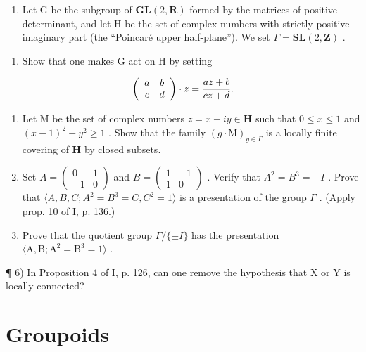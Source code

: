 \begin{enumerate}
\def\labelenumi{\arabic{enumi})}
\setcounter{enumi}{4}
\tightlist
\item
  Let G be the subgroup of \(\mathbf{GL}(2,\mathbf{R})\) formed by the matrices of positive determinant, and let H be the set of complex numbers with strictly positive imaginary part (the “Poincaré upper half-plane”). We set \(\Gamma = \mathbf{SL}(2,\mathbf{Z})\) .
\end{enumerate}

\begin{enumerate}
\def\labelenumi{\alph{enumi})}
\tightlist
\item
  Show that one makes G act on H by setting
\end{enumerate}

\[
\left( \begin{array}{c c} a & b \\ c & d \end{array} \right) \cdot z = \frac {a z + b}{c z + d}.
\]

\begin{enumerate}
\def\labelenumi{\alph{enumi})}
\setcounter{enumi}{1}
\item
  Let M be the set of complex numbers \(z = x + iy \in \mathbf{H}\) such that \(0 \leqslant x \leqslant 1\) and \((x - 1)^2 + y^2 \geqslant 1\) . Show that the family \((g \cdot \mathrm{M})_{g \in \Gamma}\) is a locally finite covering of \(\mathbf{H}\) by closed subsets.
\item
  Set \(A = \begin{pmatrix} 0 & 1 \\ -1 & 0 \end{pmatrix}\) and \(B = \begin{pmatrix} 1 & -1 \\ 1 & 0 \end{pmatrix}\) . Verify that \(A^{2} = B^{3} = -I\) . Prove that \(\langle A, B, C; A^{2} = B^{3} = C, C^{2} = 1 \rangle\) is a presentation of the group \(\Gamma\) . (Apply prop. 10 of I, p. 136.)
\item
  Prove that the quotient group \(\Gamma/\{\pm I\}\) has the presentation \(\langle\mathrm{A},\mathrm{B};\mathrm{A}^{2}=\mathrm{B}^{3}=1\rangle\) .
\end{enumerate}

¶ 6) In Proposition 4 of I, p. 126, can one remove the hypothesis that X or Y is locally connected?

\chapter{Groupoids}

